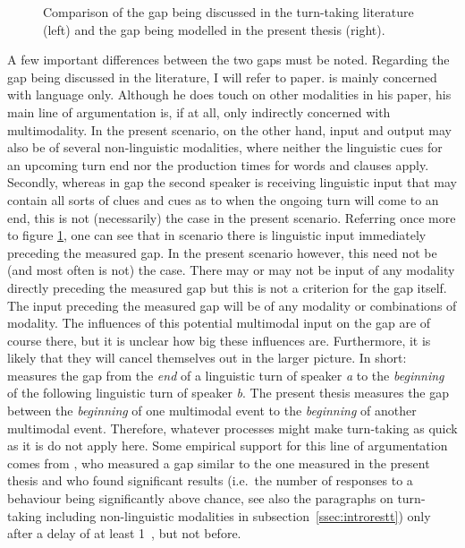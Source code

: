 \begin{figure}
	\centering
	
	\caption[Gap in the literature vs gap in the present thesis.]{Comparison of the gap being discussed in the turn-taking literature (left) and the gap being modelled in the present thesis (right).}
	\label{fig:gaps}
\end{figure}

A few important differences between the two gaps must be noted.
Regarding the gap being discussed in the literature, I will refer to  paper.
\citeauthor{levinson_turn-taking_2016} is mainly concerned with language only.
Although he does touch on other modalities in his paper, his main line of argumentation is, if at all, only indirectly concerned with multimodality.
In the present scenario, on the other hand, input and output may also be of several non-linguistic modalities, where neither the linguistic cues for an upcoming turn end nor the production times for words and clauses apply.
Secondly, whereas in  gap the second speaker is receiving linguistic input that may contain all sorts of clues and cues as to when the ongoing turn will come to an end, this is not (necessarily) the case in the present scenario.
Referring once more to figure \ref{fig:gaps}, one can see that in  scenario there is linguistic input immediately preceding the measured gap.
In the present scenario however, this need not be (and most often is not) the case.
There may or may not be input of any modality directly preceding the measured gap but this is not a criterion for the gap itself.
The input preceding the measured gap will be of any modality or combinations of modality.
The influences of this potential multimodal input on the gap are of course there, but it is unclear how big these influences are.
Furthermore, it is likely that they will cancel themselves out in the larger picture.
In short:
\citeauthor{levinson_turn-taking_2016} measures the gap from the \emph{end} of a linguistic turn of speaker \emph{a} to the \emph{beginning} of the following linguistic turn of speaker \emph{b}.
The present thesis measures the gap between the \emph{beginning} of one multimodal event to the \emph{beginning} of another multimodal event.
Therefore, whatever processes might make turn-taking as quick as it is do not apply here.
Some empirical support for this line of argumentation comes from \citet{vanegeren_mother-infant_2001}, who measured a gap similar to the one measured in the present thesis and who found significant results (i.e.~the number of responses to a behaviour being significantly above chance, see also the paragraphs on turn-taking including non-linguistic modalities in subsection~\ref{ssec:introrestt}) only after a delay of at least 1~\sone, but not before.

